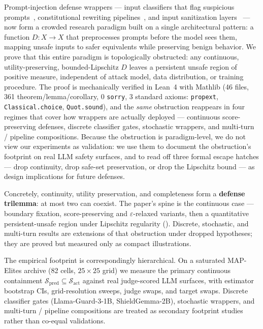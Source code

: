 \documentclass[11pt]{article}
\begin{document}
Prompt-injection defense wrappers --- input classifiers that flag
suspicious prompts~\cite{alon2023detecting}, constitutional rewriting
pipelines~\cite{bai2022constitutional}, and input sanitization
layers~\cite{inan2023llama} --- now form a crowded research paradigm
built on a single architectural pattern: a function $D\colon X \to X$
that preprocesses prompts before the model sees them, mapping unsafe
inputs to safer equivalents while preserving benign behavior. We prove
that this entire paradigm is topologically obstructed: any
continuous, utility-preserving, bounded-Lipschitz $D$ leaves a
persistent unsafe region of positive measure, independent of attack
model, data distribution, or training procedure. The proof is
mechanically verified in Lean~4 with Mathlib (46 files, 361
theorem/lemma/corollary, 0 \texttt{sorry}, 3 standard axioms:
\texttt{propext}, \texttt{Classical.choice}, \texttt{Quot.sound}), and
the \emph{same} obstruction reappears in four regimes that cover how
wrappers are actually deployed --- continuous score-preserving
defenses, discrete classifier gates, stochastic wrappers, and
multi-turn / pipeline compositions. Because the obstruction is
paradigm-level, we do not view our experiments as validation: we use
them to document the obstruction's footprint on real LLM safety
surfaces, and to read off three formal escape hatches --- drop
continuity, drop safe-set preservation, or drop the Lipschitz bound
--- as design implications for future defenses.

Concretely, continuity, utility preservation, and completeness form a
\textbf{defense trilemma}: at most two can coexist. The paper's spine is
the continuous case --- boundary fixation, score-preserving and
$\varepsilon$-relaxed variants, then a quantitative persistent-unsafe
region under Lipschitz regularity
().
Discrete, stochastic, and multi-turn results are extensions of that
obstruction under dropped hypotheses; they are proved but measured only
as compact illustrations.

The empirical footprint is correspondingly hierarchical. On a saturated
MAP-Elites archive (82 cells, $25\times25$ grid) we measure the primary
continuous containment
$\mathcal{S}_{\mathrm{pred}} \subseteq \mathcal{S}_{\mathrm{act}}$
against real judge-scored LLM surfaces, with estimator bootstrap CIs,
grid-resolution sweeps, judge swaps, and target swaps. Discrete
classifier gates (Llama-Guard-3-1B, ShieldGemma-2B), stochastic
wrappers, and multi-turn / pipeline compositions are treated as
secondary footprint studies rather than co-equal validations.
\end{document}
